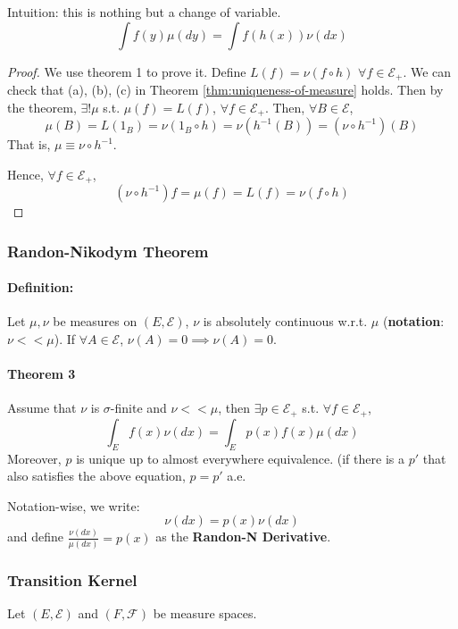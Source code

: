 \documentclass[11pt]{article}
\newcommand{\m}{\mathcal}
\begin{document}
        Intuition: this is nothing but a change of variable.
        \[
          \int f(y) \mu (dy) = \int f(h(x)) \nu (dx)
        \]

        \begin{proof}
          We use theorem 1 to prove it. Define $L(f) = \nu (f\circ h)$ $\forall f \in
          \m E_+$. We can check that (a), (b), (c) in Theorem
          \ref{thm:uniqueness-of-measure} holds. Then by the theorem, $\exists ! \mu $
          s.t. $\mu (f) =  L (f)$, $\forall f \in \m E_+$. Then, $
          \forall B \in \mathcal E$, 
          \[
            \mu(B) = L(1_B) = \nu (1_B \circ h) = \nu (h^{-1}(B) ) = (\nu\circ h^{-1})
            (B)
          \]
          That is, $\mu \equiv \nu \circ h^{-1}$. 

          Hence, $\forall f \in \m E_+$, 
          \[(\nu \circ h^{-1}) f = \mu (f) = L(f) = \nu (f\circ h)\]

        \end{proof}

        \subsubsection{Randon-Nikodym Theorem}
        \paragraph{Definition: }Let $\mu, \nu$ be measures on $(E, \m E)$, $\nu$ is
        absolutely continuous w.r.t. $\mu$ (\textbf{notation}: $\nu << \mu$). If $\forall A \in \m E$, $\nu
        (A) = 0 \implies \nu (A) = 0$. 

        \paragraph{Theorem 3} Assume that $\nu$ is $\sigma$-finite and $\nu << \mu$,
        then $\exists p \in \m E_+$ s.t. $\forall f \in \m E_+$, 
        \[
          \int_E f(x) \nu (dx)  = \int _  E p(x) f(x) \mu (d x)
        \]
        Moreover, $p$ is unique up to almost everywhere equivalence. (if there is a
        $p'$ that also satisfies the above equation, $p=p'$ a.e. 

        Notation-wise, we write: 
        \[\nu(dx) = p(x) \nu (dx)
        \]
        and define $\frac{\nu (dx)}{\mu(dx)} = p(x)$ as the \textbf{Randon-N
        Derivative}.

        \subsubsection{Transition Kernel}
        Let $(E, \m E)$ and $(F, \m F)$ be measure spaces. 
\end{document}

